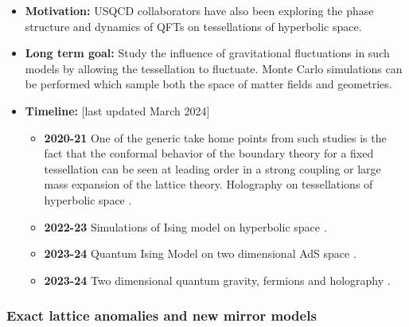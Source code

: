 \documentclass[12pt,hyperpdf]{article}
\begin{document}
\begin{itemize}
   \item{\bf Motivation:} USQCD collaborators have also been exploring the phase structure
and dynamics of QFTs on tessellations of hyperbolic space. 

\item {\bf Long term goal:} Study the influence of gravitational fluctuations in
such models by allowing the tessellation to fluctuate. Monte Carlo simulations can be
performed which sample both the space of matter fields and geometries. 
\item{\bf Timeline:} \hfill [last updated March 2024]
\begin{itemize}
\item {\bf 2020-21} One of the generic take home points from such studies is the fact that the conformal
behavior of the boundary theory for a fixed
tessellation can be seen at leading order in a strong coupling or
large mass expansion of the lattice theory. 
Holography on tessellations of hyperbolic space \cite{Asaduzzaman:2020hjl}.
\item {\bf 2022-23} Simulations of Ising model on hyperbolic space \cite{Asaduzzaman:2021bcw}.
\item {\bf 2023-24} Quantum Ising Model on two dimensional AdS space \cite{Asaduzzaman:2023htk}.
\item {\bf 2023-24} Two dimensional quantum gravity, fermions and holography \cite{Asaduzzaman:2024uue}.
\end{itemize}

\end{itemize}

\subsubsection{Exact lattice anomalies and new mirror models}
\end{document}
